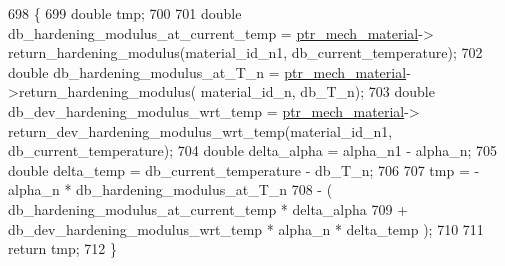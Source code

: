 \begin{DoxyCode}
698                                                                                                       \{
699         \textcolor{keywordtype}{double} tmp;
700 
701         \textcolor{keywordtype}{double} db\_hardening\_modulus\_at\_current\_temp = \hyperlink{classConstitutive__Laws_1_1Thermo__Elasto__Plastic_a5a59fd71829d58859a122fe74628a9e4}{ptr\_mech\_material}->
      return\_hardening\_modulus(material\_id\_n1, db\_current\_temperature);
702         \textcolor{keywordtype}{double} db\_hardening\_modulus\_at\_T\_n = \hyperlink{classConstitutive__Laws_1_1Thermo__Elasto__Plastic_a5a59fd71829d58859a122fe74628a9e4}{ptr\_mech\_material}->return\_hardening\_modulus(
      material\_id\_n, db\_T\_n);
703         \textcolor{keywordtype}{double} db\_dev\_hardening\_modulus\_wrt\_temp = \hyperlink{classConstitutive__Laws_1_1Thermo__Elasto__Plastic_a5a59fd71829d58859a122fe74628a9e4}{ptr\_mech\_material}->
      return\_dev\_hardening\_modulus\_wrt\_temp(material\_id\_n1, db\_current\_temperature);
704         \textcolor{keywordtype}{double} delta\_alpha = alpha\_n1 - alpha\_n;
705         \textcolor{keywordtype}{double} delta\_temp = db\_current\_temperature - db\_T\_n;
706 
707         tmp = - alpha\_n * db\_hardening\_modulus\_at\_T\_n
708               - (  db\_hardening\_modulus\_at\_current\_temp * delta\_alpha
709                    + db\_dev\_hardening\_modulus\_wrt\_temp * alpha\_n  * delta\_temp );
710 
711         \textcolor{keywordflow}{return} tmp;
712     \}
\end{DoxyCode}
